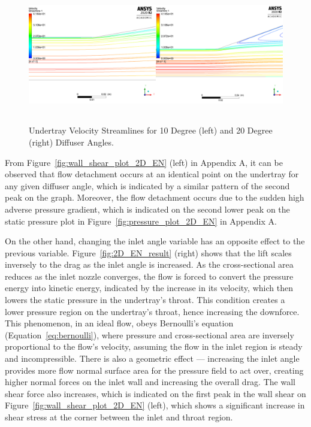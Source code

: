 \begin{figure}[!ht]
    \centering
    \includegraphics[height= 6cm]{Figures/2D_EN/2D_EN_Streamline_compare.PNG}
    \caption{Undertray Velocity Streamlines for 10 Degree (left) and 20 Degree (right) Diffuser Angles.}
    \label{fig:2D_EN_streamline_compare}
\end{figure}

\noindent From Figure~\ref{fig:wall_shear_plot_2D_EN} (left) in Appendix A, it can be observed that flow detachment occurs at an identical point on the undertray for any given diffuser angle, which is indicated by a similar pattern of the second peak on the graph. Moreover, the flow detachment occurs due to the sudden high adverse pressure gradient, which is indicated on the second lower peak on the static pressure plot in Figure~\ref{fig:pressure_plot_2D_EN} in Appendix A.

\noindent On the other hand, changing the inlet angle variable has an opposite effect to the previous variable. Figure~\ref{fig:2D_EN_result} (right) shows that the lift scales inversely to the drag as the inlet angle is increased. As the cross-sectional area reduces as the inlet nozzle converges, the flow is forced to convert the pressure energy into kinetic energy, indicated by the increase in its velocity, which then lowers the static pressure in the undertray's throat. This condition creates a lower pressure region on the undertray's throat, hence increasing the downforce. This phenomenon, in an ideal flow, obeys Bernoulli's equation (Equation~\ref{eq:bernoulli}), where pressure and cross-sectional area are inversely proportional to the flow's velocity, assuming the flow in the inlet region is steady and incompressible. There is also a geometric effect --- increasing the inlet angle provides more flow normal surface area for the pressure field to act over, creating higher normal forces on the inlet wall and increasing the overall drag. The wall shear force also increases, which is indicated on the first peak in the wall shear on Figure~\ref{fig:wall_shear_plot_2D_EN} (left), which shows a significant increase in shear stress at the corner between the inlet and throat region.

